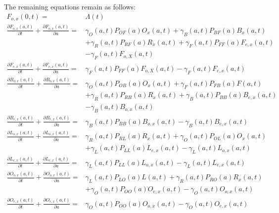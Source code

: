 \documentclass{article}
\begin{document}
The remaining equations remain as follows: 
%
\begin{equation}\begin{array}{rl}
F_{o,x}(0,t) =& \Lambda(t) \\
%
\frac{\partial F_{o,x}(a,t)}{\partial t} + \frac{\partial
F_{o,x}(a,t)}{\partial a} =&
\gamma_O(a,t) P_{OF}(a) O_x(a,t)
+ \gamma_B(a,t) P_{BF}(a) B_x(a,t)\\ &
 + \gamma_R(a,t) P_{RF}(a) R_x(a,t)
+ \gamma_F(a,t) P_{FF}(a) F_{e,x}(a,t)\\ &
- \gamma_F(a,t) F_{o,X}(a,t) \\
%
\frac{\partial F_{e,x}(a,t)}{\partial t} + \frac{\partial
F_{e,x}(a,t)}{\partial a} =&  \gamma_F(a,t) P_{FF}(a) F_{o,X} (a,t) -
\gamma_F(a,t) F_{e,x}(a,t) \\
%
%
\frac{\partial B_{o,x}(a,t)}{\partial t} + \frac{\partial
B_{o,x}(a,t)}{\partial a} =&  \gamma_O(a,t) P_{OB}(a) O_x(a,t) +
\gamma_F(a,t) P_{FB}(a) F(a,t)\\ &
+ \gamma_R(a,t) P_{RB}(a) R_x(a,t) 
+ \gamma_B(a,t) P_{BB}(a) B_{e,x}(a,t)\\ &
- \gamma_B(a,t) B_{o,x}(a,t) \\
%
\frac{\partial B_{e,x}(a,t)}{\partial t} + \frac{\partial
B_{e,x}(a,t)}{\partial a} =& \gamma_B(a,t) P_{BB}(a) B_{o,x}(a,t) -
\gamma_B(a,t) B_{e,x}(a,t)
\\

\frac{\partial L_{o,x} (a,t)}{\partial t} + \frac{\partial
L_{o,x} (a,t)}{\partial a} =& \gamma_R(a,t) P_{RL}(a) R_x(a,t) +
\gamma_O(a,t) P_{OL}(a) O_x(a,t) \\&
+ \gamma_L(a,t)  P_{LL}(a) L_{e,x}(a,t)
- \gamma_L(a,t) L_{o,x} (a,t)
\\
%
\frac{\partial L_{e,x}(a,t)}{\partial t} + \frac{\partial
L_{e,x}(a,t)}{\partial a} =& \gamma_L(a,t) P_{LL}(a) L_{o,x}  (a,t) -
\gamma_L(a,t) L_{e,x}(a,t)
\\
%
\frac{\partial O_{o,x}(a,t)}{\partial t} + \frac{\partial
O_{o,x}(a,t)}{\partial a} =& \gamma_L(a,t) P_{LO}(a) L(a,t)
+ \gamma_R(a,t) P_{RO}(a) R_x(a,t)
\\&
+ \gamma_O(a,t) P_{OO}(a) O_{e,x}(a,t)
- \gamma_O(a,t) O_{o,x}(a,t)
\\
%
\frac{\partial O_{e,x}(a,t)}{\partial t} + \frac{\partial
O_{e,x}(a,t)}{\partial a} =& \gamma_O(a,t) P_{OO}(a) O_{o,x} (a,t) -
\gamma_O(a,t) O_{e,x}(a,t)
\\
%
\end{array}\end{equation}
%
\end{document}
